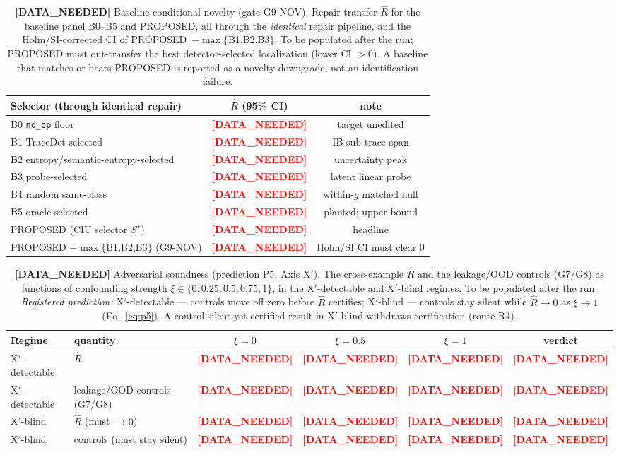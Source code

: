 \documentclass[11pt]{article}
\theoremstyle{plain}
\theoremstyle{definition}
\newcommand{\Rhat}{\widehat{R}}
\newcommand{\Sstar}{S^{\star}}
\newcommand{\dn}{\textcolor{red}{\textbf{[DATA\_NEEDED]}}}
\begin{document}
\begin{table}[h]
\centering
\caption{\textbf{[DATA\_NEEDED]} Baseline-conditional novelty (gate G9-NOV).
Repair-transfer $\Rhat$ for the baseline panel B0--B5 and PROPOSED, all through the
\emph{identical} repair pipeline, and the Holm/SI-corrected CI of
PROPOSED~$-\max\{$B1,B2,B3$\}$. To be populated after the run; PROPOSED must
out-transfer the best detector-selected localization (lower CI $>0$). A baseline that
matches or beats PROPOSED is reported as a novelty downgrade, not an identification
failure.}
\label{tab:g9nov}
\begin{tabular}{lcc}
\toprule
Selector (through identical repair) & $\Rhat$ (95\% CI) & note \\
\midrule
B0 \texttt{no\_op} floor                       & \dn & target unedited \\
B1 TraceDet-selected                           & \dn & IB sub-trace span \\
B2 entropy/semantic-entropy-selected           & \dn & uncertainty peak \\
B3 probe-selected                              & \dn & latent linear probe \\
B4 random same-class                           & \dn & within-$g$ matched null \\
B5 oracle-selected                             & \dn & planted; upper bound \\
PROPOSED (CIU selector $\Sstar$)               & \dn & headline \\
\midrule
PROPOSED $-\max\{$B1,B2,B3$\}$ (G9-NOV)        & \dn & Holm/SI CI must clear $0$ \\
\bottomrule
\end{tabular}
\end{table}

\begin{table}[h]
\centering
\caption{\textbf{[DATA\_NEEDED]} Adversarial soundness (prediction P5, Axis X$'$).
The cross-example $\Rhat$ and the leakage/OOD controls (G7/G8) as functions of
confounding strength $\xi\in\{0,0.25,0.5,0.75,1\}$, in the X$'$-detectable and
X$'$-blind regimes. To be populated after the run. \emph{Registered prediction:}
X$'$-detectable --- controls move off zero before $\Rhat$ certifies; X$'$-blind ---
controls stay silent while $\Rhat\to0$ as $\xi\to1$ (Eq.~\ref{eq:p5}). A
control-silent-yet-certified result in X$'$-blind withdraws certification (route R4).}
\label{tab:p5}
\begin{tabular}{llcccc}
\toprule
Regime & quantity & $\xi{=}0$ & $\xi{=}0.5$ & $\xi{=}1$ & verdict \\
\midrule
X$'$-detectable & $\Rhat$                       & \dn & \dn & \dn & \dn \\
X$'$-detectable & leakage/OOD controls (G7/G8)  & \dn & \dn & \dn & \dn \\
X$'$-blind      & $\Rhat$ (must $\to0$)         & \dn & \dn & \dn & \dn \\
X$'$-blind      & controls (must stay silent)   & \dn & \dn & \dn & \dn \\
\bottomrule
\end{tabular}
\end{table}
\end{document}
